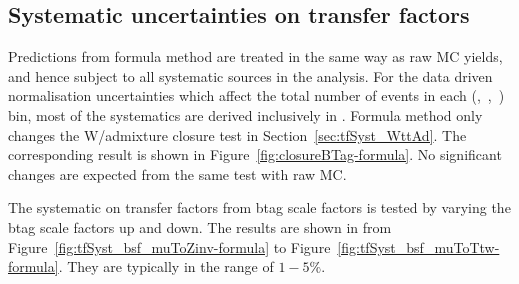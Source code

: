 \begin{figure}

\end{figure}

\subsection{Systematic uncertainties on transfer factors\label{sec:btag-syst}}
Predictions from formula method are treated in the same way as raw MC yields, 
and hence subject to all systematic sources in the analysis. For the data driven normalisation 
uncertainties which affect the total number of events in each (\njet,~\nb,~\scalht) bin, 
most of the systematics are derived inclusively in \nb. Formula method only changes
the W/\ttbar admixture closure test in Section~\ref{sec:tfSyst_WttAd}. 
The corresponding result is shown in Figure~\ref{fig:closureBTag-formula}. No significant changes are expected from the same test with raw MC.

The systematic on transfer factors from btag scale factors is tested by varying 
the btag scale factors up and down. The results are shown in
 from Figure~\ref{fig:tfSyst_bsf_muToZinv-formula} to Figure~\ref{fig:tfSyst_bsf_muToTtw-formula}.
They are typically in the range of $1-5\%$.



